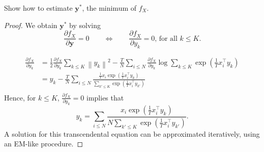 
\begin{exercise}
Show how to estimate $\mathbf{y}^*$, the minimum of $f_X$.
\end{exercise}

\begin{proof}
We obtain $\mathbf{y}^*$ by solving
%
\begin{equation}
\frac{\partial f_X}{\partial \mathbf{y}}= 0 \qquad \Leftrightarrow \qquad \frac{\partial f_X}{\partial y_k} = 0\text{, for all $k \leq K$}.
\end{equation}
%

\begin{align*}
\frac{\partial f_X}{\partial y_k} &= \frac{1}{2}\frac{\partial f_X}{\partial y_k}\sum_{k \leq K}\left\|y_k\right\|^2 - \frac{T}{N}\sum_{i \leq N}\frac{\partial f_X}{\partial y_k}\log\sum_{k \leq K}\exp\left(\frac{1}{T}x_i^\top y_k\right)\\
&= y_k - \frac{T}{N}\sum_{i \leq N}\frac{\frac{1}{T}x_i\exp\left(\frac{1}{T}x_i^\top y_k\right)}{\sum_{k' \leq K}\exp\left(\frac{1}{T}x_i^\top y_{k'}\right)}\\
\end{align*}
%
Hence, for $k \leq K$, $\frac{\partial f_X}{\partial y_k}= 0$ implies that 
%
$$y_k = \sum_{i \leq N}\frac{x_i\exp\left(\frac{1}{T}x_i^\top y_k\right)}{N\sum_{k' \leq K}\exp\left(\frac{1}{T}x_i^\top y_{k'}\right)}.$$
%
A solution for this transcendental equation can be approximated iteratively, using an EM-like procedure.
\end{proof}

